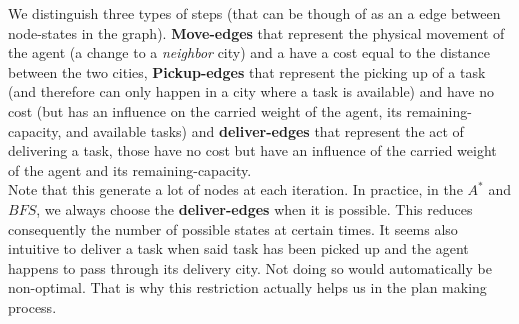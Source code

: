 \documentclass[11pt]{article}
\begin{document}

We distinguish three types of steps (that can be though of as an a edge between node-states in the graph). \textbf{Move-edges} that represent the physical movement of the agent (a change to a \emph{neighbor} city) and a have a cost equal to the distance between the two cities, \textbf{Pickup-edges} that represent the picking up of a task (and therefore can only happen in a city where a task is available) and have no cost (but has an influence on the carried weight of the agent, its remaining-capacity, and available tasks) and \textbf{deliver-edges} that represent the act of delivering a task, those have no cost but have an influence of the carried weight of the agent and its remaining-capacity. \\

Note that this generate a lot of nodes at each iteration. In practice, in the $A^*$  and $BFS$, we always choose the \textbf{deliver-edges} when it is possible. This reduces consequently the number of possible states at certain times. It seems also intuitive to deliver a task when said task has been picked up and the agent happens to pass through its delivery city. Not doing so would automatically be non-optimal. That is why this restriction actually helps us in the plan making process.
\end{document}

